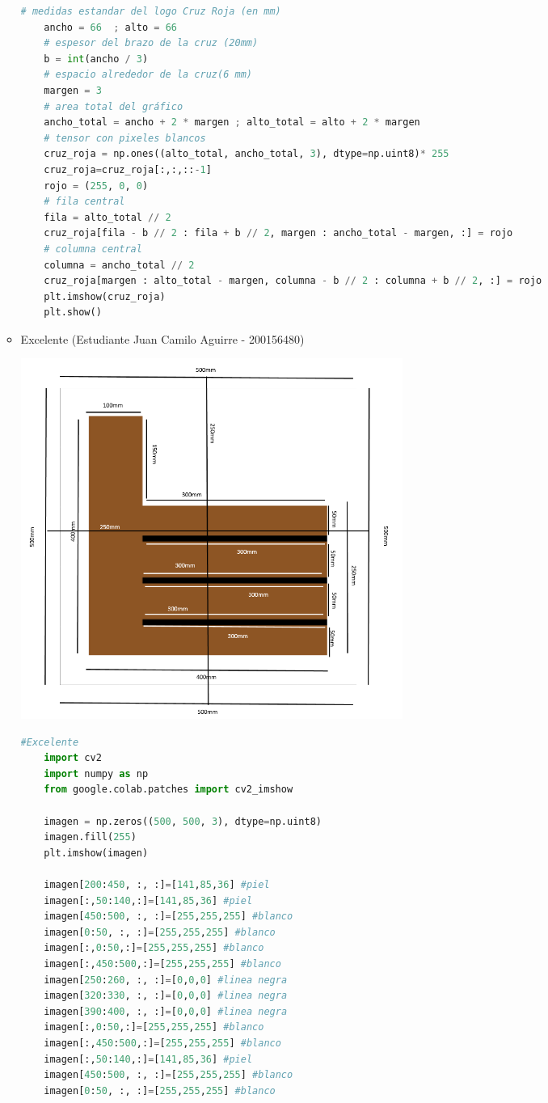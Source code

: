 \begin{enumerate}
\begin{itemize}
\begin{lstlisting}[language=Python]
    # medidas estandar del logo Cruz Roja (en mm)
    ancho = 66  ; alto = 66
    # espesor del brazo de la cruz (20mm)
    b = int(ancho / 3)
    # espacio alrededor de la cruz(6 mm)
    margen = 3
    # area total del gráfico
    ancho_total = ancho + 2 * margen ; alto_total = alto + 2 * margen
    # tensor con pixeles blancos
    cruz_roja = np.ones((alto_total, ancho_total, 3), dtype=np.uint8)* 255
    cruz_roja=cruz_roja[:,:,::-1]
    rojo = (255, 0, 0)
    # fila central
    fila = alto_total // 2
    cruz_roja[fila - b // 2 : fila + b // 2, margen : ancho_total - margen, :] = rojo
    # columna central
    columna = ancho_total // 2
    cruz_roja[margen : alto_total - margen, columna - b // 2 : columna + b // 2, :] = rojo
    plt.imshow(cruz_roja)
    plt.show()
    \end{lstlisting}
    \item Excelente  (Estudiante Juan Camilo Aguirre - 200156480)
    \begin{center}
    \includegraphics[width=125mm]{imagenes-colab/maquetaex.png}
    \end{center}
    \begin{lstlisting}[language=Python]
    #Excelente
    import cv2
    import numpy as np
    from google.colab.patches import cv2_imshow
    
    imagen = np.zeros((500, 500, 3), dtype=np.uint8)
    imagen.fill(255)
    plt.imshow(imagen)
    
    imagen[200:450, :, :]=[141,85,36] #piel
    imagen[:,50:140,:]=[141,85,36] #piel
    imagen[450:500, :, :]=[255,255,255] #blanco
    imagen[0:50, :, :]=[255,255,255] #blanco
    imagen[:,0:50,:]=[255,255,255] #blanco
    imagen[:,450:500,:]=[255,255,255] #blanco
    imagen[250:260, :, :]=[0,0,0] #linea negra
    imagen[320:330, :, :]=[0,0,0] #linea negra
    imagen[390:400, :, :]=[0,0,0] #linea negra
    imagen[:,0:50,:]=[255,255,255] #blanco
    imagen[:,450:500,:]=[255,255,255] #blanco
    imagen[:,50:140,:]=[141,85,36] #piel
    imagen[450:500, :, :]=[255,255,255] #blanco
    imagen[0:50, :, :]=[255,255,255] #blanco
    

\end{lstlisting}
\end{itemize}
\end{enumerate}
